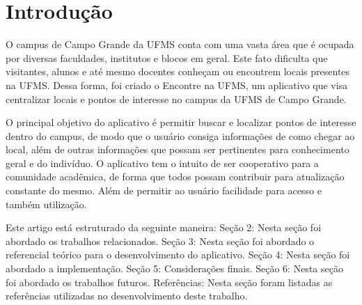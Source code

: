 \section{Introdução}
O campus de Campo Grande da UFMS conta com uma vasta área que é ocupada por diversas faculdades, institutos e blocos em geral. Este fato dificulta que visitantes, alunos e até mesmo docentes conheçam ou encontrem locais presentes na UFMS. Dessa forma, foi criado o Encontre na UFMS, um aplicativo que visa centralizar locais e pontos de interesse no campus da UFMS de Campo Grande.

O principal objetivo do aplicativo é permitir buscar e localizar pontos de interesse dentro do campus, de modo que o usuário consiga informações de como chegar ao local, além de outras informações que possam ser pertinentes para conhecimento geral e do indivíduo. O aplicativo tem o intuito de ser cooperativo para a comunidade acadêmica, de forma que todos possam contribuir para atualização constante do mesmo. Além de permitir ao usuário facilidade para acesso e também utilização.

Este artigo está estruturado da seguinte maneira: Seção 2: Nesta seção foi abordado os trabalhos relacionados. Seção 3: Nesta seção foi abordado o referencial teórico para o desenvolvimento do aplicativo. Seção 4: Nesta seção foi abordado a implementação. Seção 5: Considerações finais. Seção 6: Nesta seção foi abordado os trabalhos futuros. Referências: Nesta seção foram listadas as referências utilizadas no desenvolvimento deste trabalho.